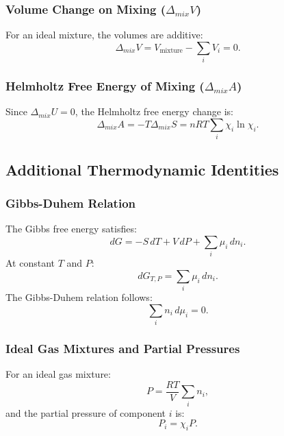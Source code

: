 \documentclass{article}
\theoremstyle{definition}
\begin{document}
\subsubsection{Volume Change on Mixing (\(\Delta_{mix}V\))}
For an ideal mixture, the volumes are additive:
\begin{equation}
\Delta_{mix} V = V_{\text{mixture}} - \sum_i V_i = 0.
\end{equation}

\subsubsection{Helmholtz Free Energy of Mixing (\(\Delta_{mix}A\))}
Since \(\Delta_{mix} U = 0\), the Helmholtz free energy change is:
\begin{equation}
\Delta_{mix} A = -T\Delta_{mix} S = nRT\sum_i \chi_i\ln{\chi_i}.
\end{equation}

\subsection{Additional Thermodynamic Identities}

\subsubsection{Gibbs-Duhem Relation}
The Gibbs free energy satisfies:
\begin{equation}
dG = -S\,dT + V\,dP + \sum_i \mu_i\,dn_i.
\end{equation}
At constant \(T\) and \(P\):
\begin{equation}
dG_{T,P} = \sum_i \mu_i\,dn_i.
\end{equation}
The Gibbs-Duhem relation follows:
\begin{equation}
\sum_i n_i\,d\mu_i = 0.
\end{equation}

\subsubsection{Ideal Gas Mixtures and Partial Pressures}
For an ideal gas mixture:
\begin{equation}
P = \frac{RT}{V}\sum_i n_i,
\end{equation}
and the partial pressure of component \(i\) is:
\begin{equation}
P_i = \chi_i P.
\end{equation}
\end{document}

